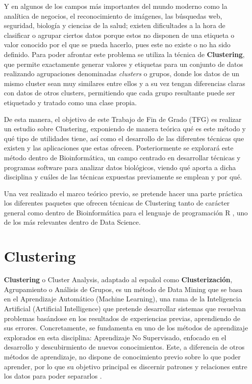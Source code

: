 \documentclass[3p,twocolumn]{elsarticle}
\begin{document}
Y en algunos de los campos más importantes del mundo moderno como la analítica de negocios, el reconocimiento de imágenes, las búsquedas web, seguridad, biología y ciencias de la salud; existen dificultades a la hora de clasificar o agrupar ciertos datos porque estos no disponen de una etiqueta o valor conocido por el que se pueda hacerlo, pues este no existe o no ha sido definido. Para poder afrontar este problema se utiliza la técnica de \textbf{Clustering}, que permite exactamente generar valores y etiquetas para un conjunto de datos realizando agrupaciones denominadas \textit{clusters} o grupos, donde los datos de un mismo cluster sean muy similares entre ellos y a su vez tengan diferencias claras con datos de otros clusters, permitiendo que cada grupo resultante puede ser etiquetado y tratado como una clase propia.

De esta manera, el objetivo de este Trabajo de Fin de Grado (TFG) es realizar un estudio sobre Clustering, exponiendo de manera teórica qué es este método y qué tipo de utilidades tiene, así como el desarrollo de las diferentes técnicas que existen y las aplicaciones que estas ofrecen. Posteriormente se explorará este método dentro de Bioinformática, un campo centrado en desarrollar técnicas y programas software para analizar datos biológicos, viendo qué aporta a dicha disciplina y cuáles de las técnicas expuestas previamente se emplean y por qué. 

Una vez realizado el marco teórico previo, se pretende hacer una parte práctica los diferentes paquetes que ofrecen técnicas de Clustering tanto de carácter general como dentro de Bioinformática para el lenguaje de programación R \cite{6}, uno de los más relevantes dentro de Data Science.




\section{Clustering} 

\textbf{Clustering} o Cluster Analysis, adaptado al español como \textbf{Clusterización}, Agrupamiento o Análisis de Grupos, es un método de Data Mining que se basa en el Aprendizaje Automático (Machine Learning), una rama de la Inteligencia Artificial (Artificial Intelligence) que pretende desarrollar sistemas que resuelvan problemas basándose en los resultados de experiencias previas, aprendiendo de sus errores. Concretamente, se fundamenta en uno de los métodos de aprendizaje explorados en esta disciplina: Aprendizaje No Supervisado, enfocado en el desarrollo y descubirmiento de nuevos conocimientos. Este, a diferencia de otros métodos de aprendizaje, no dispone de conocimiento previo sobre lo que poder aprender, por lo que su objetivo principal es discernir patrones y relaciones entre los datos para poder separarlos \cite{7}.
\end{document}
